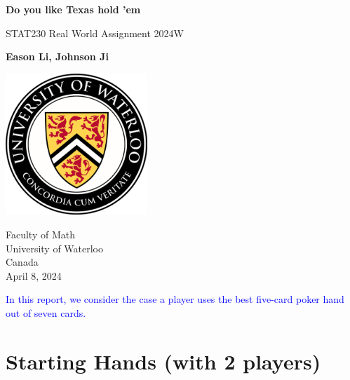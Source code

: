 \documentclass{article}
\begin{document}
\begin{titlepage}
    \begin{center}
        \vspace*{0.6cm}
            
        \Huge
        \textbf{Do you like Texas hold 'em}
            
        \vspace{0.5cm}
        \LARGE
        STAT230 Real World Assignment 2024W
            
        \vspace{1.5cm}
            
        \textbf{Eason Li, Johnson Ji}
            
        \vspace{3.6cm}
        
        \begin{center}
            \includegraphics[width = 0.4\textwidth]{images/UofLoo.png}
        \end{center}

        \vspace{0.4cm}
            
        \Large
        Faculty of Math \\
        University of Waterloo \\
        Canada \\
        April 8, 2024
    \end{center}
\end{titlepage}

\newpage

\begin{center}
    \textcolor{blue}{
        In this report, we consider the case a player uses the best 
        five-card poker hand out of seven cards.
    }
\end{center}



\section*{Starting Hands (with 2 players)}
\end{document}
